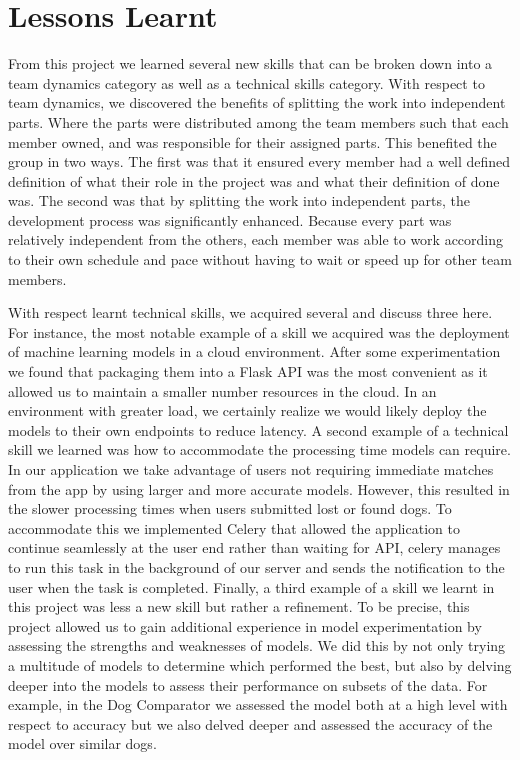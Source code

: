 \documentclass{article}
\begin{document}
\newpage

\section{Lessons Learnt}
From this project we learned several new skills that can be broken down into a team dynamics category as well as a technical skills category.  With respect to team dynamics, we discovered the benefits of splitting the work into independent parts.  Where the parts were distributed among the team members such that each member owned, and was responsible for their assigned parts.  This benefited the group in two ways.  The first was that it ensured every member had a well defined definition of what their role in the project was and what their definition of done was.  The second was that by splitting the work into independent parts, the development process was significantly enhanced.  Because every part was relatively independent from the others, each member was able to work according to their own schedule and pace without having to wait or speed up for other team members.  

With respect learnt technical skills, we acquired several and discuss three here.  For instance, the most notable example of a skill we acquired was the deployment of machine learning models in a cloud environment.  After some experimentation we found that packaging them into a Flask API was the most convenient as it allowed us to maintain a smaller number resources in the cloud.  In an environment with greater load, we certainly realize we would likely deploy the models to their own endpoints to reduce latency.  A second example of a technical skill we learned was how to accommodate the processing time models can require.  In our application we take advantage of users not requiring immediate matches from the app by using larger and more accurate models.  However, this resulted in the slower processing times when users submitted lost or found dogs.  To accommodate this we implemented Celery that allowed the application to continue seamlessly at the user end rather than waiting for API, celery manages to run this task in the background of our server and sends the notification to the user when the task is completed.  Finally, a third example of a skill we learnt in this project was less a new skill but rather a refinement.  To be precise, this project allowed us to gain additional experience in model experimentation by assessing the strengths and weaknesses of models.  We did this by not only trying a multitude of models to determine which performed the best, but also by delving deeper into the models to assess their performance on subsets of the data.  For example, in the Dog Comparator we assessed the model both at a high level with respect to accuracy but we also delved deeper and assessed the accuracy of the model over similar dogs.
\end{document}
